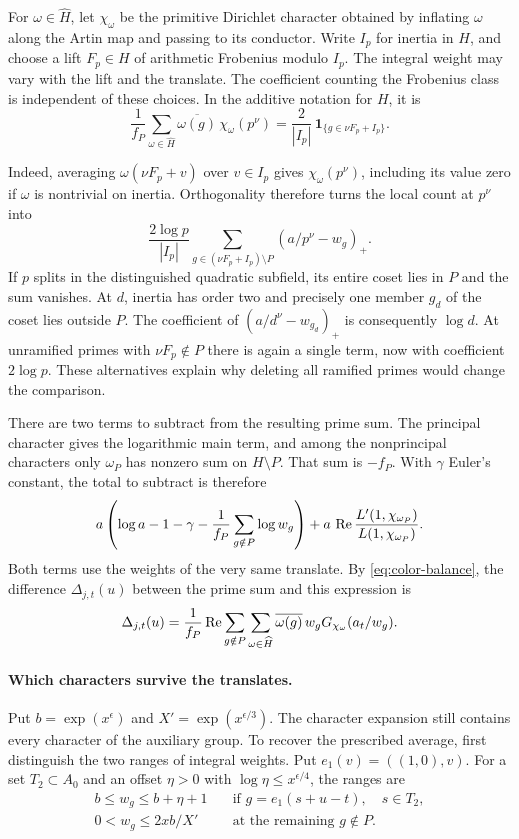 For \(\omega\in\widehat H\), let \(\chi_\omega\) be the primitive
Dirichlet character obtained by inflating \(\omega\) along the Artin
map and passing to its conductor. Write \(I_p\) for inertia in \(H\),
and choose a lift \(F_p\in H\) of arithmetic Frobenius modulo
\(I_p\). The integral weight may vary with the lift and the translate.
The coefficient counting the Frobenius class is independent of
these choices. In the additive notation for \(H\), it is
\[
 \frac1{f_P}\sum_{\omega\in\widehat H}\overline{\omega(g)}\,
                    \chi_\omega(p^\nu)
   =\frac{2}{|I_p|}\,\mathbf 1_{\{g\in\nu F_p+I_p\}}.
\]

Indeed, averaging \(\omega(\nu F_p+v)\) over \(v\in I_p\) gives
\(\chi_\omega(p^\nu)\), including its value zero if \(\omega\) is
nontrivial on inertia. Orthogonality therefore turns the local count at \(p^\nu\) into
\[
 \frac{2\log p}{|I_p|}
      \sum_{g\in(\nu F_p+I_p)\setminus P}(a/p^\nu-w_g)_+ .
\]
If \(p\) splits in the distinguished quadratic subfield, its entire
coset lies in \(P\) and the sum vanishes. At \(d\), inertia has order
two and precisely one member \(g_d\) of the coset lies outside \(P\).
The coefficient of \((a/d^\nu-w_{g_d})_+\) is consequently \(\log d\).
At unramified primes with \(\nu F_p\notin P\) there is again a
single term, now with coefficient \(2\log p\). These alternatives
explain why deleting all ramified primes would change the comparison.

There are two terms to subtract from the resulting prime sum. The
principal character gives the logarithmic main term, and among the
nonprincipal characters only \(\omega_P\) has nonzero sum on
\(H\setminus P\). That sum is \(-f_P\). With \(\gamma\) Euler's
constant, the total to subtract is therefore
\[
 a\left(\log a-1-\gamma-\frac1{f_P}\sum_{g\notin P}\log w_g\right)
    +a\,\operatorname{Re}\frac{L'(1,\chi_{\omega_P})}{L(1,\chi_{\omega_P})}.
\]
Both terms use the weights of the very same translate. By
\eqref{eq:color-balance}, the difference \(\Delta_{j,t}(u)\) between
the prime sum and this expression is
\[
 \Delta_{j,t}(u)=\frac1{f_P}\operatorname{Re}
 \sum_{g\notin P}\sum_{\omega\in\widehat H}
     \overline{\omega(g)}\,w_g G_{\chi_\omega}(a_t/w_g).
\]

\paragraph{Which characters survive the translates.}
Put \(b=\exp(x^\epsilon)\) and \(X'=\exp(x^{\epsilon/3})\). The character expansion still contains every character of the auxiliary group. To
recover the prescribed average, first distinguish the two ranges of integral weights. Put
\(e_1(v)=((1,0),v)\). For a set \(T_2\subset A_0\) and an offset
\(\eta>0\) with \(\log\eta\le x^{\epsilon/4}\), the ranges are
\[
\begin{aligned}
  b\le w_g\le b+\eta+1
       &\quad\text{if }g=e_1(s+u-t),\quad s\in T_2,\\
  0<w_g\le 2xb/X'&\quad\text{at the remaining }g\notin P .
\end{aligned}
\]

